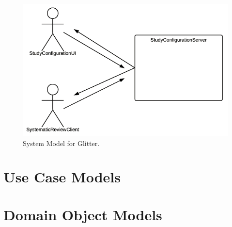




\begin{figure}[!h]
    \centering
    \includegraphics[width=.95\textwidth]{./uml/SysModel.png}
    \caption{System Model for Glitter.}
    \label{fig:SysModel}
\end{figure}


\section{Use Case Models}




\section{Domain Object Models}
%
%

